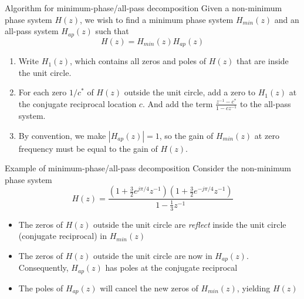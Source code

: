 \documentclass[10pt, handout]{beamer}
\begin{document}
%
\begin{frame}{Algorithm for minimum-phase/all-pass decomposition}
Given a non-minimum phase system $H(z)$, we wish to find a minimum phase system $H_{min}(z)$ and an all-pass system $H_{ap}(z)$ such that
\begin{equation*}
H(z) = H_{min}(z)H_{ap}(z)
\end{equation*}
\begin{enumerate}
	\item Write $H_1(z)$, which contains all zeros and poles of $H(z)$ that are inside the unit circle.
	\item For each zero $1/c^*$ of $H(z)$ outside the unit circle, add a zero to $H_1(z)$ at the conjugate reciprocal location $c$. And add the term $\frac{z^{-1} - c^*}{1 - cz^{-1}}$ to the all-pass system.
	\item By convention, we make $|H_{ap}(z)| = 1$, so the gain of $H_{min}(z)$ at zero frequency must be equal to the gain of $H(z)$.
\end{enumerate}
\end{frame}

\begin{frame}{Example of minimum-phase/all-pass decomposition}
Consider the non-minimum phase system
\begin{equation*}
H(z) = \frac{(1 + \frac{3}{2}e^{j\pi/4}z^{-1})(1 + \frac{3}{2}e^{-j\pi/4}z^{-1})}{1 - \frac{1}{3}z^{-1}}
\end{equation*}

\hspace*{-0.85cm}\resizebox{0.95\paperwidth}{!}{}
\begin{itemize}
	\item The zeros of $H(z)$ outside the unit circle are \textit{reflect} inside the unit circle (conjugate reciprocal) in $H_{min}(z)$
	\item The zeros of $H(z)$ outside the unit circle are now in $H_{ap}(z)$. Consequently, $H_{ap}(z)$ has poles at the conjugate reciprocal
	\item The poles of $H_{ap}(z)$ will cancel the new zeros of $H_{min}(z)$, yielding $H(z)$
\end{itemize}

\end{frame}
\end{document}
